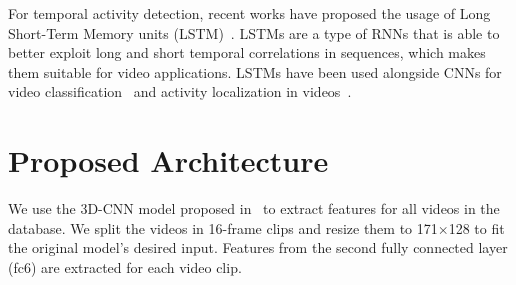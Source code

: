 \documentclass{article}
\begin{document}
For temporal activity detection, recent works have proposed the usage of Long Short-Term Memory units (LSTM)~\cite{hochreiter1997long}.
LSTMs are a type of RNNs that is able to better exploit long and short temporal correlations in sequences, which makes them suitable for video applications.
LSTMs have been used alongside CNNs for video classification~\cite{yao2015describing} and activity localization in videos~\cite{yeung2015every}.


\section{Proposed Architecture}



We use the 3D-CNN model proposed in~\cite{tran2014learning} to extract features for all videos in the database. We split the videos in 16-frame clips and resize them to 171$\times$128 to fit the original model's desired input. Features from the second fully connected layer (fc6) are extracted for each video clip.


\end{document}
